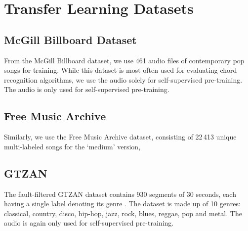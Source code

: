 

\section{Transfer Learning Datasets}
\subsection{McGill Billboard Dataset}
From the McGill Billboard dataset, we use 461 audio files of contemporary pop songs for training.
While this dataset is most often used for evaluating chord recognition algorithms, we use the audio solely for self-supervised pre-training. The audio is only used for self-supervised pre-training.

\subsection{Free Music Archive}
Similarly, we use the Free Music Archive dataset, consisting of 22\,413 unique multi-labeled songs for the `medium' version, 

\subsection{GTZAN}
The fault-filtered GTZAN dataset contains 930 segments of 30 seconds, each having a single label denoting its genre \cite{Sturm2015, tzanetakis2002musical}. The dataset is made up of 10 genres: classical, country, disco, hip-hop, jazz, rock, blues, reggae, pop and metal. The audio is again only used for self-supervised pre-training.

